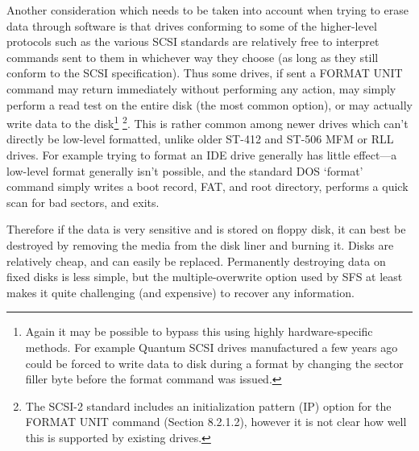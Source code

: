 Another consideration which needs to be taken into account when trying to erase
data through software is that drives conforming to some of the higher-level 
protocols such as the various SCSI standards are relatively free to interpret 
commands sent to them in whichever way they choose (as long as they still 
conform to the SCSI specification).  Thus some drives, if sent a FORMAT UNIT 
command may return immediately without performing any action, may simply 
perform a read test on the entire disk (the most common option), or may 
actually write data to the disk\footnote{
               Again it may be possible to bypass this using highly
               hardware-specific methods.  For example Quantum SCSI drives manufactured
               a few years ago could be forced to write data to disk during a
               format by changing the sector filler byte before the format
               command was issued.
} \footnote{
		The SCSI-2 standard includes an initialization pattern (IP)
              	option for the FORMAT UNIT command (Section 8.2.1.2), however it
              	is not clear how well this is supported by existing drives.
}.  This is rather common among newer 
drives which can't directly be low-level formatted, unlike older ST-412 and 
ST-506 MFM or RLL drives.  For example trying to format an IDE drive generally 
has little effect---a low-level format generally isn't possible, and the 
standard DOS `format' command simply writes a boot record, FAT, and root 
directory, performs a quick scan for bad sectors, and exits.

Therefore if the data is very sensitive and is stored on floppy disk, it can
best be destroyed by removing the media from the disk liner and burning it.
Disks are relatively cheap, and can easily be replaced.  Permanently destroying
data on fixed disks is less simple, but the multiple-overwrite option used by
SFS at least makes it quite challenging (and expensive) to recover any
information.


